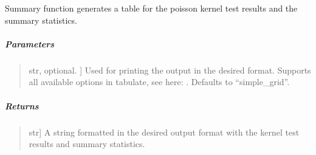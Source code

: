 \documentclass[letterpaper,10pt,english,openany,oneside]{sphinxmanual}
\begin{document}

\begin{fulllineitems}
\label{\detokenize{api_reference/generated/QuadratiK.poisson_kernel_test.PoissonKernelTest:QuadratiK.poisson_kernel_test.PoissonKernelTest.summary}}
\pysigstartsignatures
{}
\pysigstopsignatures
\sphinxAtStartPar
Summary function generates a table for 
the poisson kernel test results and the summary statistics.


\subparagraph{Parameters}
\label{\detokenize{api_reference/generated/QuadratiK.poisson_kernel_test.PoissonKernelTest:id1}}\begin{quote}
\begin{description}
\sphinxlineitem{print\_fmt}{[}str, optional. {]}
\sphinxAtStartPar
Used for printing the output in the desired format. 
Supports all available options in tabulate, 
see here: . 
Defaults to “simple\_grid”.

\end{description}
\end{quote}


\subparagraph{Returns}
\label{\detokenize{api_reference/generated/QuadratiK.poisson_kernel_test.PoissonKernelTest:id2}}\begin{quote}
\begin{description}
\sphinxlineitem{summary}{[}str{]}
\sphinxAtStartPar
A string formatted in the desired output 
format with the kernel test results and summary statistics.

\end{description}
\end{quote}

\end{fulllineitems}

\end{document}

